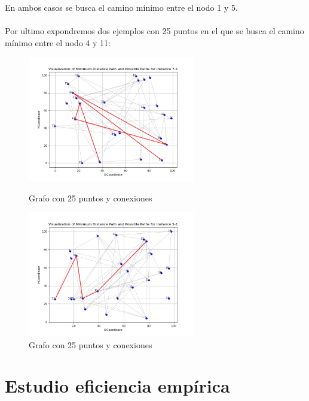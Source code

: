 \documentclass[11pt,openany]{book}
\begin{document}
En ambos casos se busca el camino mínimo entre el nodo 1 y 5.\\ \\
Por ultimo expondremos dos ejemplos con 25 puntos en el que se busca el camino mínimo entre el nodo 4 y 11:
\begin{figure}[H]
      \centering
      \includegraphics[width=0.65\textwidth]{assets/Img/GraficaCaminoMinimo-7-1.png}
      \caption{Grafo con 25 puntos y conexiones}
      \centering
      \includegraphics[width=0.65\textwidth]{assets/Img/GraficaCaminoMinimo-5-1.png}
      \caption{Grafo con 25 puntos y conexiones}
\end{figure}
\section{Estudio eficiencia empírica}
\end{document}
